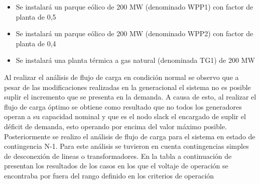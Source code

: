 \documentclass{article}
\begin{document}
\begin{itemize}
    \item Se instalará un parque eólico de 200 MW (denominado WPP1) con factor de planta de 0,5
    \item Se instalará un parque eólico de 200 MW (denominado WPP2) con factor de planta de 0,4
    \item Se instalará una planta térmica a gas natural (denominada TG1) de 200 MW
    
\end{itemize}


Al realizar el análisis de flujo de carga en condición normal se observo que a pesar de las modificaciones realizadas en la generacional el sistema no es posible suplir el incremento que se presenta en la demanda. A causa de esto, al realizar el flujo de carga óptimo se obtiene como resultado que no todos los generadores operan a su capacidad nominal y que es el nodo slack el encargado de suplir el déficit de demanda, esto operando por encima del valor máximo posible. Posteriormente se realizo el análisis de flujo de carga para el sistema en estado de contingencia N-1. Para este análisis se tuvieron en cuenta contingencias simples de desconexión de lineas o transformadores. En la tabla a continuación de presentan los resultados de los casos en los que el voltaje de operación se encontraba por fuera del rango definido en los criterios de operación
\end{document}
